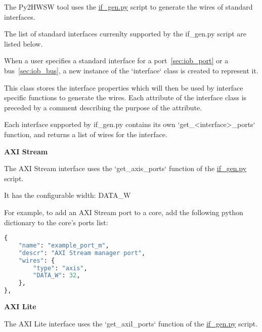 %

%
%

The Py2HWSW tool uses the \href{https://github.com/IObundle/py2hwsw/blob/main/py2hwsw/scripts/if_gen.py}{if\_gen.py} script to generate the wires of standard interfaces.

The list of standard interfaces currenlty supported by the if\_gen.py script are listed below.


When a user specifies a standard interface for a port~\ref{sec:iob_port} or a bus~\ref{sec:iob_bus}, a new instance of the `interface` class is created to represent it.


This class stores the interface properties which will then be used by interface specific functions to generate the wires.
Each attribute of the interface class is preceded by a comment describing the purpose of the attribute.

Each interface supported by if\_gen.py contains its own `get\_\textless interface\textgreater\_ports` function, and returns a list of wires for the interface.

%
%
\clearpage
\large\textbf{AXI Stream}

The AXI Stream interface uses the `get\_axis\_ports` function of the \href{https://github.com/IObundle/py2hwsw/blob/main/py2hwsw/scripts/if_gen.py}{if\_gen.py} script.


It has the configurable width: DATA\_W

For example, to add an AXI Stream port to a core, add the following python dictionary to the core's ports list:
\begin{lstlisting}[language=python]
{
	"name": "example_port_m",
	"descr": "AXI Stream manager port",
	"wires": {
		"type": "axis",
		"DATA_W": 32,
	},
},
\end{lstlisting}


%
%
\clearpage
\large\textbf{AXI Lite}

The AXI Lite interface uses the `get\_axil\_ports` function of the \href{https://github.com/IObundle/py2hwsw/blob/main/py2hwsw/scripts/if_gen.py}{if\_gen.py} script.

